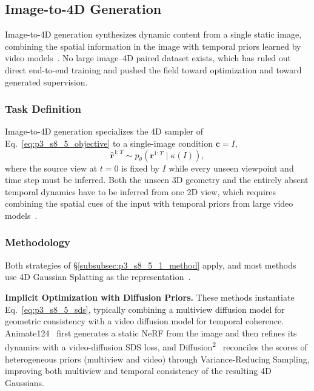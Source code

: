 

\subsection{Image-to-4D Generation}
\label{subsec:p3_s8_5_2}
Image-to-4D generation synthesizes dynamic content from a single static image, combining the spatial information in the image with temporal priors learned by video models~\cite{yang2024diffusion,sun2024eg4d}. No large image--4D paired dataset exists, which has ruled out direct end-to-end training and pushed the field toward optimization and toward generated supervision.

\subsubsection{Task Definition}
\label{subsubsec:p3_s8_5_2_task}
Image-to-4D generation specializes the 4D sampler of Eq.~\eqref{eq:p3_s8_5_objective} to a single-image condition $\mathbf{c}=I$,
\begin{equation}
\label{eq:p3_s8_5_2_objective}
\hat{\mathbf{r}}^{1:T}\sim p_\theta\!\left(\mathbf{r}^{1:T}\mid\kappa(I)\right),
\end{equation}
where the source view at $t=0$ is fixed by $I$ while every unseen viewpoint and time step must be inferred.
Both the unseen 3D geometry and the entirely absent temporal dynamics have to be inferred from one 2D view, which requires combining the spatial cues of the input with temporal priors from large video models~\cite{ren2023dreamgaussian4d,zhao2023animate124,sun2024eg4d}.



\subsubsection{Methodology}
\label{subsubsec:p3_s8_5_2_method}
Both strategies of §\ref{subsubsec:p3_s8_5_1_method} apply, and most methods use 4D Gaussian Splatting as the representation~\cite{ren2023dreamgaussian4d,yang2024diffusion}.

\textbf{Implicit Optimization with Diffusion Priors.} These methods instantiate Eq.~\eqref{eq:p3_s8_5_sds}, typically combining a multiview diffusion model for geometric consistency with a video diffusion model for temporal coherence. Animate124~\cite{zhao2023animate124} first generates a static NeRF from the image and then refines its dynamics with a video-diffusion SDS loss, and Diffusion\textsuperscript{2}~\cite{yang2024diffusion} reconciles the scores of heterogeneous priors (multiview and video) through Variance-Reducing Sampling, improving both multiview and temporal consistency of the resulting 4D Gaussians.

